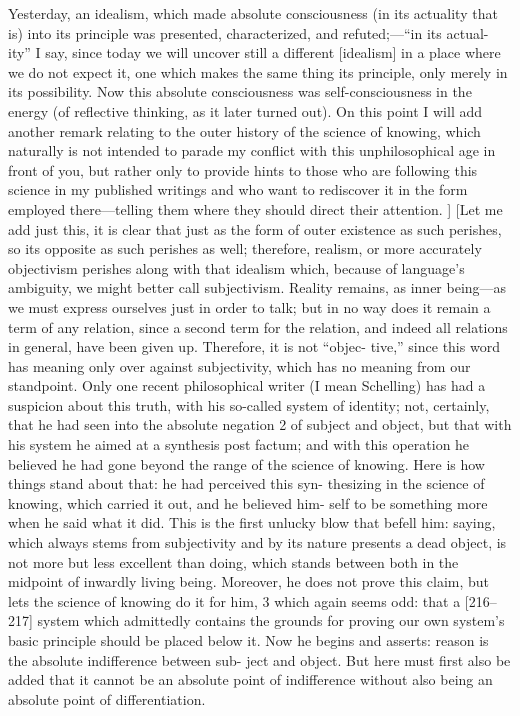Yesterday, an idealism, which made absolute consciousness (in its actuality that
is) into its principle was presented, characterized, and refuted;—“in its actual-
ity” I say, since today we will uncover still a different [idealism] in a place where
we do not expect it, one which makes the same thing its principle, only merely
in its possibility.
Now this absolute consciousness was self-consciousness in the
energy (of reflective thinking, as it later turned out).
On this point I will add
another remark relating to the outer history of the science of knowing, which
naturally is not intended to parade my conflict with this unphilosophical age in
front of you, but rather only to provide hints to those who are following this
science in my published writings and who want to rediscover it in the form
employed there—telling them where they should direct their attention.
]
[Let me add just this, it is clear that just as the form of outer existence
as such perishes, so its opposite as such perishes as well; therefore, realism, or
more accurately objectivism perishes along with that idealism which, because
of language’s ambiguity, we might better call subjectivism.
Reality remains, as
inner being—as we must express ourselves just in order to talk; but in no way
does it remain a term of any relation, since a second term for the relation, and
indeed all relations in general, have been given up.
Therefore, it is not “objec-
tive,” since this word has meaning only over against subjectivity, which has no
meaning from our standpoint.
Only one recent philosophical writer (I mean
Schelling) has had a suspicion about this truth, with his so-called system of
identity; not, certainly, that he had seen into the absolute negation 2 of subject
and object, but that with his system he aimed at a synthesis post factum; and
with this operation he believed he had gone beyond the range of the science
of knowing.
Here is how things stand about that: he had perceived this syn-
thesizing in the science of knowing, which carried it out, and he believed him-
self to be something more when he said what it did.
This is the first unlucky
blow that befell him: saying, which always stems from subjectivity and by its
nature presents a dead object, is not more but less excellent than doing, which
stands between both in the midpoint of inwardly living being.
Moreover, he
does not prove this claim, but lets the science of knowing do it for him, 3 which
again seems odd: that a [216–217] system which admittedly contains the
grounds for proving our own system’s basic principle should be placed below
it.
Now he begins and asserts: reason is the absolute indifference between sub-
ject and object.
But here must first also be added that it cannot be an absolute
point of indifference without also being an absolute point of differentiation.

